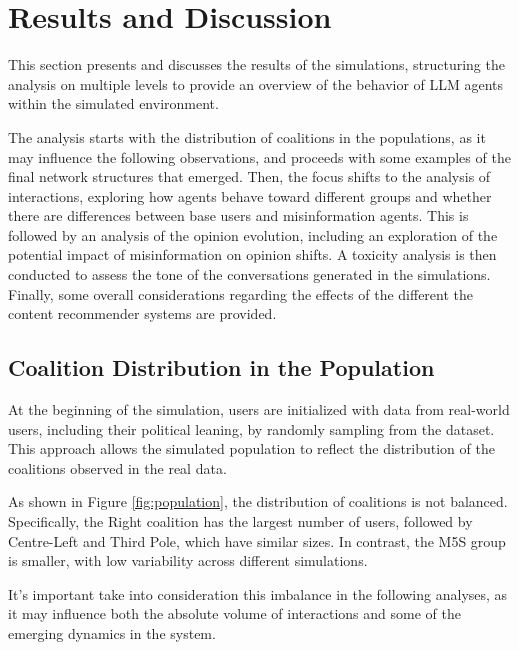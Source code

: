 \section{Results and Discussion}
\label{sec:discussion}

This section presents and discusses the results of the simulations, structuring the analysis on multiple levels to provide an overview of the behavior of LLM agents within the simulated environment.

The analysis starts with the distribution of coalitions in the populations, as it may influence the following observations, and proceeds with some examples of the final network structures that emerged.
Then, the focus shifts to the analysis of interactions, exploring how agents behave toward different groups and whether there are differences between base users and misinformation agents.
This is followed by an analysis of the opinion evolution, including an exploration of the potential impact of misinformation on opinion shifts.
A toxicity analysis is then conducted to assess the tone of the conversations generated in the simulations.
Finally, some overall considerations regarding the effects of the different the content recommender systems are provided.


\subsection{Coalition Distribution in the Population}
At the beginning of the simulation, users are initialized with data from real-world users, including their political leaning, by randomly sampling from the dataset.
This approach allows the simulated population to reflect the distribution of the coalitions observed in the real data.

As shown in Figure \ref{fig:population}, the distribution of coalitions is not balanced.
Specifically, the Right coalition has the largest number of users, followed by Centre-Left and Third Pole, which have similar sizes.
In contrast, the M5S group is smaller, with low variability across different simulations.

It's important take into consideration this imbalance in the following analyses, as it may influence both the absolute volume of interactions and some of the emerging dynamics in the system.


